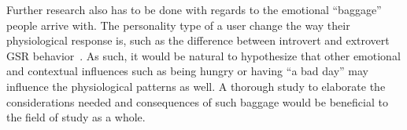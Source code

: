 Further research also has to be done with regards to the emotional ``baggage'' people arrive with. 
The personality type of a user change the way their physiological response is, such as the difference between introvert and extrovert GSR behavior~\cite{Foglia20081814}.
As such, it would be natural to hypothesize that other emotional and contextual influences such as being hungry or having ``a bad day'' may influence the physiological patterns as well. 
A thorough study to elaborate the considerations needed and consequences of such baggage would be beneficial to the field of study as a whole. 